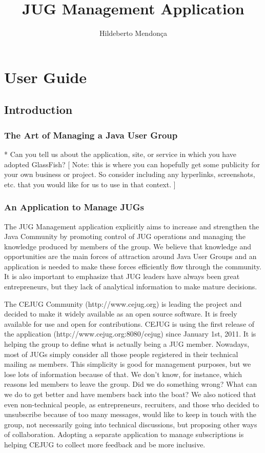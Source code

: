 \documentclass[10pt,a4paper]{report}
\author{Hildeberto Mendon\c{c}a}
\title{JUG Management Application}
\begin{document}
\maketitle
\tableofcontents
\part{User Guide}
\chapter{Introduction}

\section{The Art of Managing a Java User Group}

* Can you tell us about the application, site, or service in which you have
  adopted GlassFish?
   [ Note: this is where you can hopefully get some publicity for your
     own business or project.  So consider including any hyperlinks,
     screenshots, etc. that you would like for us to use in that context. ]

\section{An Application to Manage JUGs}

The JUG Management application explicitly aims to increase and strengthen the Java Community by promoting control of JUG operations and managing the knowledge produced by members of the group. We believe that knowledge and opportunities are the main forces of attraction around Java User Groups and an application is needed to make these forces efficiently flow through the community. It is also important to emphasize that JUG leaders have always been great entrepreneurs, but they lack of analytical information to make mature decisions.

The CEJUG Community (http://www.cejug.org) is leading the project and decided to make it widely available as an open source software. It is freely available for use and open for contributions. CEJUG is using the first release of the application (http://www.cejug.org:8080/cejug) since January 1st, 2011. It is helping the group to define what is actually being a JUG member. Nowadays, most of JUGs simply consider all those people registered in their technical mailing as members. This simplicity is good for management purposes, but we lose lots of information because of that. We don't know, for instance, which reasons led members to leave the group. Did we do something wrong? What can we do to get better and have members back into the boat? We also noticed that even non-technical people, as entrepreneurs, recruiters, and those who decided to unsubscribe because of too many messages, would like to keep in touch with the group, not necessarily going into technical discussions, but proposing other ways of collaboration. Adopting a separate application to manage subscriptions is helping CEJUG to collect more feedback and be more inclusive.
\end{document}
